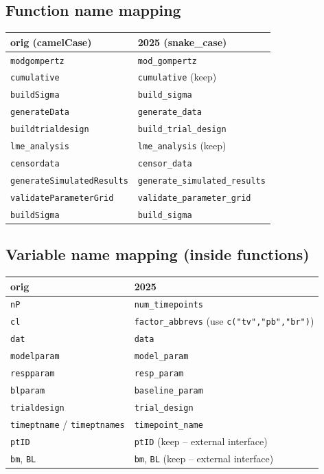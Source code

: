 \documentclass[11pt]{article}
\begin{document}
\subsection{Function name mapping}

\begin{table}[h]
\centering
\begin{tabular}{ll}
\toprule
orig (camelCase) & 2025 (snake\_case) \\
\midrule
\texttt{modgompertz} & \texttt{mod\_gompertz} \\
\texttt{cumulative} & \texttt{cumulative} (keep) \\
\texttt{buildSigma} & \texttt{build\_sigma} \\
\texttt{generateData} & \texttt{generate\_data} \\
\texttt{buildtrialdesign} & \texttt{build\_trial\_design} \\
\texttt{lme\_analysis} & \texttt{lme\_analysis} (keep) \\
\texttt{censordata} & \texttt{censor\_data} \\
\texttt{generateSimulatedResults} & \texttt{generate\_simulated\_results} \\
\texttt{validateParameterGrid} & \texttt{validate\_parameter\_grid} \\
\texttt{buildSigma} & \texttt{build\_sigma} \\
\bottomrule
\end{tabular}
\end{table}

\subsection{Variable name mapping (inside functions)}

\begin{table}[h]
\centering
\begin{tabular}{ll}
\toprule
orig & 2025 \\
\midrule
\texttt{nP} & \texttt{num\_timepoints} \\
\texttt{cl} & \texttt{factor\_abbrevs} (use \texttt{c("tv","pb","br")}) \\
\texttt{dat} & \texttt{data} \\
\texttt{modelparam} & \texttt{model\_param} \\
\texttt{respparam} & \texttt{resp\_param} \\
\texttt{blparam} & \texttt{baseline\_param} \\
\texttt{trialdesign} & \texttt{trial\_design} \\
\texttt{timeptname} / \texttt{timeptnames} & \texttt{timepoint\_name} \\
\texttt{ptID} & \texttt{ptID} (keep -- external interface) \\
\texttt{bm}, \texttt{BL} & \texttt{bm}, \texttt{BL} (keep -- external interface) \\
\bottomrule
\end{tabular}
\end{table}
\end{document}
